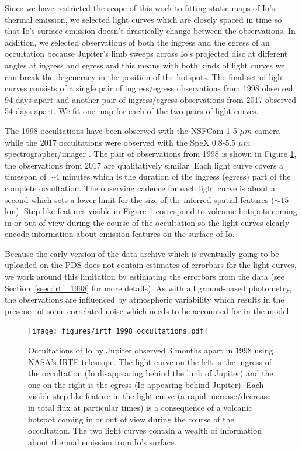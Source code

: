 \documentclass[12pt,dvipsnames]{report}
\begin{document}
Since we have restricted the scope of this work to fitting static maps of Io's 
thermal emission, we selected light curves which are closely spaced in time so that 
Io's surface emission doesn't drastically change between the observations.
In addition, we selected observations of both the ingress and the egress of an 
occultation because Jupiter's limb sweeps across Io's projected disc at different 
angles at ingress and egress and this means with both kinds of light curves we can 
break the degeneracy in the position of the hotspots.
The final set of light curves consists of a single pair of ingress/egress observations 
from 1998 observed 94 days apart and another pair of ingress/egress observations from 
2017 observed 54 days apart. 
We fit one map for each of the two pairs of light curves.

The 1998 occultations have been observed with the NSFCam 1-5 $\mu m$ camera 
\citep{1994SPIE.2198..614S} while the 2017 occultations were observed with the 
SpeX 0.8-5.5 $\mu m$ spectrographer/imager \citep{2003PASP..115..362R}.
The pair of observations from 1998 is shown in Figure \ref{fig:irtf_1998_data}, the 
observations from 2017 are qualitatively similar.
Each light curve covers a timespan of $\sim 4$ minutes which is the duration of the 
ingress (egress) part of the complete occultation.
The observing cadence for each light curve is about a second which sets a lower limit 
for the size of the inferred spatial features ($\sim 15$km).
Step-like features visible in Figure \ref{fig:irtf_1998_data} correspond to  volcanic 
hotspots coming in or out of view during the course of the occultation so the light curves clearly encode information about emission features on the surface of Io.

Because the early version of the data archive which is eventually going to be uploaded 
on the PDS does not contain estimates of errorbars for the light curves, we work around 
this limitation by estimating the errorbars from the data (see Section~\ref{ssec:irtf_1998} 
for more details).
As with all ground-based photometry, the observations are influenced by atmospheric 
variability which results in the presence of some correlated noise which needs to 
be accounted for in the model.

\begin{figure}[t!]
    \begin{centering}
    \texttt{[image: figures/irtf\_1998\_occultations.pdf]}
    \caption{
       Occultations of Io by Jupiter observed 3 months apart in 1998 using NASA's IRTF telescope.
        The light curve on the left is the ingress of the occultation (Io disappearing behind the limb of Jupiter) and the one on the right is the egress (Io appearing behind Jupiter).
       Each visible step-like feature in the light curve (a rapid increase/decrease in total flux at particular times) is a  consequence of a volcanic hotspot coming in or out of view during the course of the occultation.
        The two light curves contain a wealth of information about thermal emission from Io's surface. 
    }
       \label{fig:irtf_1998_data}
    \end{centering}
\end{figure}
\end{document}
